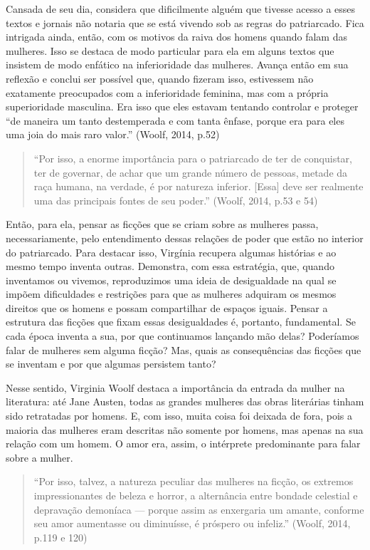 Cansada de seu dia, considera que dificilmente alguém que tivesse acesso
a esses textos e jornais não notaria que se está vivendo sob as regras
do patriarcado. Fica intrigada ainda, então, com os motivos da raiva dos
homens quando falam das mulheres. Isso se destaca de modo particular
para ela em alguns textos que insistem de modo enfático na inferioridade
das mulheres. Avança então em sua reflexão e conclui ser possível que,
quando fizeram isso, estivessem não exatamente preocupados com a
inferioridade feminina, mas com a própria superioridade masculina. Era
isso que eles estavam tentando controlar e proteger ``de maneira um
tanto destemperada e com tanta ênfase, porque era para eles uma joia do
mais raro valor.'' (Woolf, 2014, p.52)

\begin{quote}
``Por isso, a enorme importância para o patriarcado de ter de
conquistar, ter de governar, de achar que um grande número de pessoas,
metade da raça humana, na verdade, é por natureza inferior. {[}Essa{]}
deve ser realmente uma das principais fontes de seu poder.'' (Woolf,
2014, p.53 e 54)
\end{quote}

Então, para ela, pensar as ficções que se criam sobre as mulheres passa,
necessariamente, pelo entendimento dessas relações de poder que estão no
interior do patriarcado. Para destacar isso, Virgínia recupera algumas
histórias e ao mesmo tempo inventa outras. Demonstra, com essa
estratégia, que, quando inventamos ou vivemos, reproduzimos uma ideia de
desigualdade na qual se impõem dificuldades e restrições para que as
mulheres adquiram os mesmos direitos que os homens e possam compartilhar
de espaços iguais. Pensar a estrutura das ficções que fixam essas
desigualdades é, portanto, fundamental. Se cada época inventa a sua, por
que continuamos lançando mão delas? Poderíamos falar de mulheres sem
alguma ficção? Mas, quais as consequências das ficções que se inventam e
por que algumas persistem tanto?

Nesse sentido, Virginia Woolf destaca a importância da entrada da mulher
na literatura: até Jane Austen, todas as grandes mulheres das obras
literárias tinham sido retratadas por homens. E, com isso, muita coisa
foi deixada de fora, pois a maioria das mulheres eram descritas não
somente por homens, mas apenas na sua relação com um homem. O amor era,
assim, o intérprete predominante para falar sobre a mulher.

\begin{quote}
``Por isso, talvez, a natureza peculiar das mulheres na ficção, os
extremos impressionantes de beleza e horror, a alternância entre bondade
celestial e depravação demoníaca --- porque assim as enxergaria um
amante, conforme seu amor aumentasse ou diminuísse, é próspero ou
infeliz.'' (Woolf, 2014, p.119 e 120)
\end{quote}

